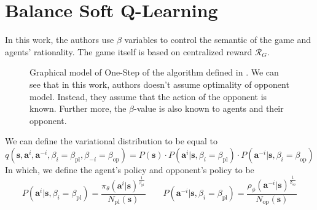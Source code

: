 \section{Balance Soft Q-Learning \cite{grau2018balancing}}
In this work, the authors use $\beta$ variables to control the semantic of the game and agents' rationality. The game itself is based on centralized reward $\mathcal{R}_G$.  
\begin{figure}[ht]
    \begin{minipage}[t]{0.5\linewidth}
    \centering
    \label{Balancing-Graphical}
    \end{minipage}%
    \begin{minipage}[t]{0.5\linewidth}
    Graphical model of One-Step of the algorithm defined in  \cite{grau2018balancing}. We can see that in this work, authors doesn't assume optimality of opponent model. Instead, they assume that the action of the opponent is known. Further more, the $\beta$-value is also known to agents and their opponent.
    \end{minipage}
\end{figure}
We can define the variational distribution to be equal to 
\begin{equation}
     q(\boldsymbol{s}, \boldsymbol{a}^i, \boldsymbol{a}^{-i}, \beta_i = \beta_{\text{pl}}, \beta_{-i} = \beta_{\text{op}}) = P(\boldsymbol{s}) \cdot P(\boldsymbol{a}^i | \boldsymbol{s}, \beta_i = \beta_{\text{pl}}) \cdot P(\boldsymbol{a}^{-i} | \boldsymbol{s}, \beta_i = \beta_{\text{op}})
\end{equation}
In which, we define the agent's policy and opponent's policy to be 
\begin{equation}
     P(\boldsymbol{a}^i | \boldsymbol{s}, \beta_i = \beta_{\text{pl}}) = \frac{\pi_{\theta}(\boldsymbol{a}^i |\boldsymbol{s})^{\frac{1}{\beta_{\text{pl}}}}}{N_{\text{pl}}(\boldsymbol{s})} \quad \quad P(\boldsymbol{a}^{-i} | \boldsymbol{s}, \beta_i = \beta_{\text{pl}}) = \frac{\rho_{\phi}(\boldsymbol{a}^{-i} |\boldsymbol{s})^{\frac{1}{\beta_{\text{op}}}}}{N_{\text{op}}(\boldsymbol{s})}
\end{equation}
